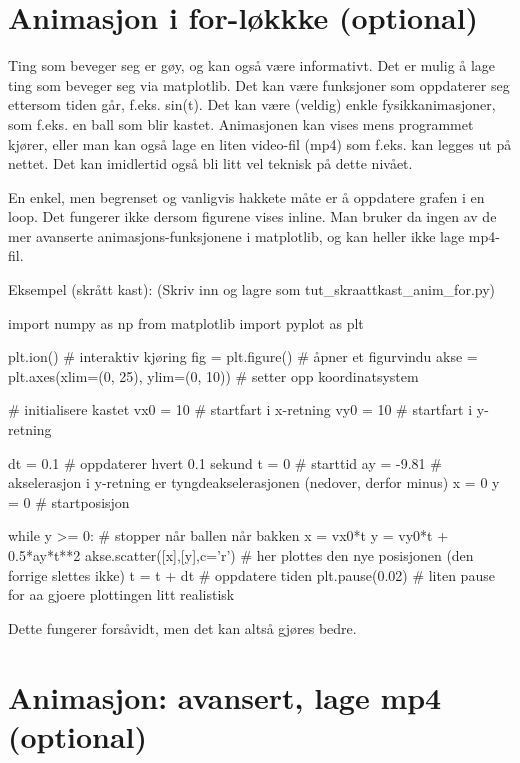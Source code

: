 \section{Animasjon i for-løkkke (optional)}

Ting som beveger seg er gøy, og kan også være informativt. Det er mulig å lage ting som beveger seg via matplotlib. Det kan være funksjoner som oppdaterer seg ettersom tiden går, f.eks. sin(t). Det kan være (veldig) enkle fysikkanimasjoner, som f.eks. en ball som blir kastet. Animasjonen kan vises mens programmet kjører, eller man kan også lage en liten video-fil (mp4) som f.eks. kan legges ut på nettet. Det kan imidlertid også bli litt vel teknisk på dette nivået. 

En enkel, men begrenset og vanligvis hakkete måte er å oppdatere grafen i en loop. Det fungerer ikke dersom figurene vises inline. Man bruker da ingen av de mer avanserte animasjons-funksjonene i matplotlib, og kan heller ikke lage mp4-fil.

Eksempel (skrått kast):
(Skriv inn og lagre som tut\_{}skraattkast\_{}anim\_{}for.py) 

\begin{usncodebox}
import numpy as np
from matplotlib import pyplot as plt

plt.ion()   # interaktiv kjøring
fig = plt.figure()    # åpner et figurvindu
akse = plt.axes(xlim=(0, 25), ylim=(0, 10))  # setter opp koordinatsystem

# initialisere kastet
vx0 = 10       # startfart i x-retning
vy0 = 10       # startfart i y-retning

dt = 0.1       # oppdaterer hvert 0.1 sekund
t = 0          # starttid
ay = -9.81     # akselerasjon i y-retning er tyngdeakselerasjonen (nedover, derfor minus)
x = 0 
y = 0          # startposisjon 

while y >= 0:  # stopper når ballen når bakken
    x = vx0*t
    y = vy0*t + 0.5*ay*t**2
    akse.scatter([x],[y],c='r')  # her plottes den nye posisjonen (den forrige slettes ikke)
    t = t + dt          # oppdatere tiden
    plt.pause(0.02)     # liten pause for aa gjoere plottingen litt realistisk
\end{usncodebox}

Dette fungerer forsåvidt, men det kan altså gjøres bedre.

\section{Animasjon: avansert, lage mp4 (optional)}

